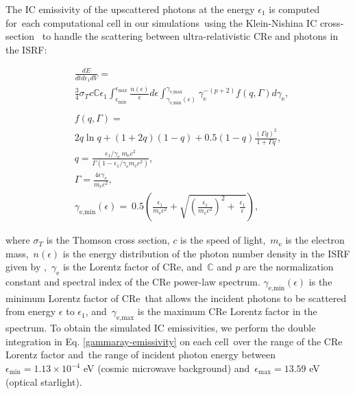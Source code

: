 \documentclass[fleqn,usenatbib,useAMS]{mnras}
\begin{document}
The IC emissivity of the upscattered photons at the energy $\epsilon_{1}$ is computed for\
each computational cell in our simulations\
using the Klein-Nishina IC cross-section \citep{Jones1968,BLUMENTHAL1970}\
to handle the scattering between ultra-relativistic CRe and photons in the ISRF:

\begin{subequations}
  \begin{align}
  &\frac{dE}{dtd\epsilon_{1}dV} =\nonumber\\
               &\frac{3}{4}\sigma_{T}c\mathbb{C}\epsilon_{1}\int^{\epsilon_{\text{max}}}_{\epsilon_{\text{min}}}
               \frac{n(\epsilon)}{\epsilon}d\epsilon\int^{\gamma_{\text{e,max}}}_{\gamma_{\text{e,min}}\left(\epsilon\right)}
               \gamma_{\text{e}}^{-(p+2)}f(q, \Gamma)d\gamma_{\text{e}},\\
  \nonumber\\
  &f(q, \Gamma) =\nonumber\\
               &2q\ln q+(1+2q)(1-q)+0.5(1-q)\frac{\left(\Gamma q\right)^2}{1+\Gamma q},\\
  &q=\frac{\epsilon_{1}/\gamma_{\text{e}}\
               m_{\text{e}}c^{2}}{\Gamma\left(1-\epsilon_{1}/\gamma_{\text{e}} m_{\text{e}}c^{2}\right)},\\
  &\Gamma=\frac{4\epsilon \gamma_{\text{e}}}{m_{\text{e}}c^2},\\
  &\gamma_{\text{e,min}}(\epsilon)=\
   0.5\left(\frac{\epsilon_{1}}{m_{\text{e}}c^2}+\sqrt{\left(\frac{\epsilon_{1}}{m_{\text{e}}c^2}\right)^2+\
   \frac{\epsilon_{1}}{\epsilon}}\right) \label{gamma-min},
  \end{align}
\label{gammaray-emissivity}
\end{subequations}

where $\sigma_{T}$ is the Thomson cross section, $c$ is the speed of light,\
$m_{\text{e}}$ is the electron mass,\
$n(\epsilon)$ is the energy distribution of the photon number density in the ISRF given by \citet{Porter2017},\
$\gamma_{\text{e}}$ is the Lorentz factor of CRe, and\
$\mathbb{C}$ and $p$ are the normalization constant and spectral index of the CRe power-law spectrum.
$\gamma_{\text{e,min}}(\epsilon)$ is the minimum Lorentz factor of CRe\
that allows the incident photons to be scattered from energy $\epsilon$ to $\epsilon_{1}$, and\
$\gamma_{\text{e,max}}$ is the maximum CRe Lorentz factor in the spectrum. To obtain the simulated IC emissivities, we perform the double integration in Eq. \ref{gammaray-emissivity} on each cell\
over the range of the CRe Lorentz factor and\
the range of incident photon energy between\
$\epsilon_{\text{min}}=1.13\times10^{-4}$ eV (cosmic microwave background) and\
$\epsilon_{\text{max}}=13.59$ eV (optical starlight).\
\end{document}
